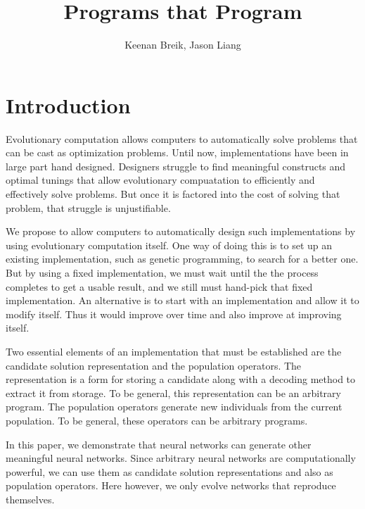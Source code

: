 \documentclass[12pt]{article}
\begin{document}
\title{Programs that Program}

\author{Keenan Breik, Jason Liang}
\date{}
\maketitle

\begin{abstract}
\end{abstract}

\section{Introduction}
\label{intro}

Evolutionary computation allows computers
to automatically solve problems
that can be cast as optimization problems.
Until now, implementations have been
in large part hand designed.
Designers struggle to find meaningful constructs
and optimal tunings that allow evolutionary compuatation
to efficiently and effectively solve problems.
But once it is factored into the cost
of solving that problem,
that struggle is unjustifiable.

We propose to allow computers
to automatically design such implementations
by using evolutionary computation itself.
One way of doing this is to set up
an existing implementation,
such as genetic programming,
to search for a better one.
But by using a fixed implementation,
we must wait until the the process completes
to get a usable result,
and we still must hand-pick that fixed implementation.
An alternative is to start with an implementation
and allow it to modify itself.
Thus it would improve over time
and also improve at improving itself.

Two essential elements of an implementation
that must be established
are the candidate solution representation
and the population operators.
The representation is a form for storing a candidate
along with a decoding method
to extract it from storage.
To be general,
this representation can be an arbitrary program.
The population operators
generate new individuals from the current population.
To be general,
these operators can be arbitrary programs.

In this paper,
we demonstrate that neural networks
can generate other meaningful neural networks.
Since arbitrary neural networks are computationally powerful,%
\cite{sperduti1997netpower}
we can use them as candidate solution representations
and also as population operators.
Here however,
we only evolve networks
that reproduce themselves.
\end{document}
